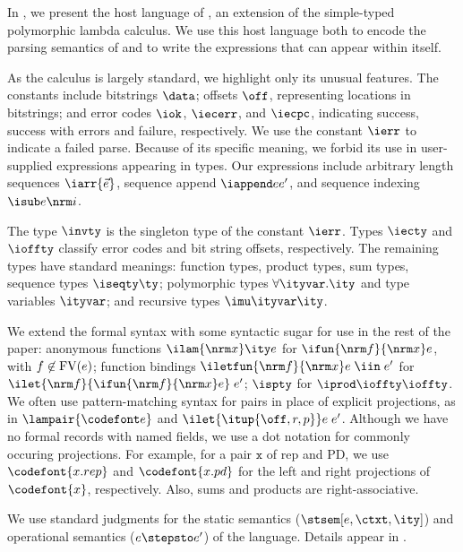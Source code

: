 In , we present the host language of \ddc{}, an
extension of the simple-typed polymorphic lambda calculus. 
We use this host language both to encode the parsing semantics of \ddc{} 
and to write the expressions that can appear within \ddc{} itself.

As the calculus is largely standard, we highlight only its
unusual features. The constants include bitstrings $\data$; offsets $\off$,
representing locations in bitstrings; and error codes $\iok$,
$\iecerr$, and $\iecpc$, indicating success, success with errors and
failure, respectively. We use the constant $\ierr$ to indicate a
failed parse.  
Because of its specific meaning, we forbid its use in user-supplied expressions
appearing in \ddc{} types. 
Our expressions include arbitrary length
sequences $\iarr{\vec e}$, sequence append $\iappend e
{e'}$, and sequence indexing $\isub e {\nrm i}$.

The type $\invty$ is the singleton type of the constant $\ierr$.
Types $\iecty$ and $\ioffty$ classify error codes and bit string
offsets, respectively. The remaining types have standard
meanings: function types, product types, sum types, sequence types
$\iseqty \ty$; polymorphic types $\forall \ityvar.\ity$ and type
variables $\ityvar$; and recursive types $\imu \ityvar \ity$.

We extend the formal syntax with some syntactic sugar 
for use in the rest of the paper: anonymous functions
$\ilam {\nrm x} \ity e$ for $\ifun {\nrm f} {\nrm x} e$, with $f
\not\in {\rm FV}(e)$; function bindings $\iletfun {\nrm f} {\nrm x} e
\; \iin \; e'$ for $\ilet {\nrm f} {\ifun {\nrm f} {\nrm x} e} \; e'$;
$\ispty$ for $\iprod \ioffty \ioffty$.  We often use
pattern-matching syntax for pairs in place of explicit projections, as
in $\lampair{\codefont e}$ and $\ilet {\itup{\off,r,p}} e\; e'$.  Although
we have no formal records with named fields, we use a dot notation for
commonly occuring projections. For example, for a pair $\mathtt x$ of
rep and PD, we use $\codefont{x.rep}$ and $\codefont{x.pd}$ for the
left and right projections of $\codefont{x}$, respectively.  Also, sums and products are
right-associative. 

We use standard judgments for the static semantics
($\stsem[e,{\ctxt},\ity]$) and operational semantics ($e
\stepsto e'$) of the \implang{} language. Details appear in .

